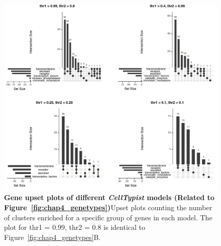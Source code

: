 \begin{figure}[ht!] 
\centering
\includegraphics[scale=0.79]{Appendix2/Figs/appB_upset.png} %
\caption[Gene upset plots of different \textit{CellTypist} models]{\textbf{Gene upset plots of different \textit{CellTypist} models (Related to Figure~\ref{fig:chap4_genetypes})}\newline Upset plots counting the number of clusters enriched for a specific group of genes in each model. The plot for thr1 = 0.99, thr2 = 0.8 is identical to Figure~\ref{fig:chap4_genetypes}B.}
\label{fig:appB_supupset}
\end{figure}



